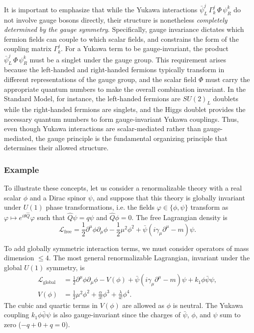 It is important to emphasize that while the Yukawa interactions $\bar{\psi}_L^j \, \Gamma^j_k \, \Phi \, \psi_R^k$ do not involve gauge bosons directly, their structure is nonetheless \textit{completely determined by the gauge symmetry}. Specifically, gauge invariance dictates which fermion fields can couple to which scalar fields, and constrains the form of the coupling matrix $\Gamma^j_k$. For a Yukawa term to be gauge-invariant, the product $\bar{\psi}_L^j \, \Phi \, \psi_R^k$ must be a singlet under the gauge group. This requirement arises because the left-handed and right-handed fermions typically transform in different representations of the gauge group, and the scalar field $\Phi$ must carry the appropriate quantum numbers to make the overall combination invariant. In the Standard Model, for instance, the left-handed fermions are $SU(2)_L$ doublets while the right-handed fermions are singlets, and the Higgs doublet provides the necessary quantum numbers to form gauge-invariant Yukawa couplings. Thus, even though Yukawa interactions are scalar-mediated rather than gauge-mediated, the gauge principle is the fundamental organizing principle that determines their allowed structure.

\subsubsection{Example}
To illustrate these concepts, let us consider a renormalizable theory with a real scalar $\phi$ and a Dirac spinor $\psi$, and suppose that this theory is globally invariant under $U(1)$ phase transformations, i.e. the fields $\varphi\in\{\phi,\psi\}$ transform as $\varphi\mapsto e^{i\theta \hat Q}\varphi $ such that $\hat Q \psi = q \psi$ and $\hat Q \phi=0$. The free Lagrangian density is
\begin{equation}
	\mathcal L_{\text{free}}=\frac{1}{2} \partial^{\mu} \phi \partial_{\mu} \phi-\frac{1}{2}\mu^2\phi^2+\bar{\psi}(i \gamma_\mu  \partial^\mu-m) \psi.
\end{equation}

To add globally symmetric interaction terms, we must consider operators of mass dimension $\leq 4$. The most general renormalizable Lagrangian, invariant under the global $U(1)$ symmetry, is
\begin{equation}
	\begin{aligned}
		\mathcal L_{\text{global}}&=\frac{1}{2} \partial^{\mu} \phi \partial_{\mu} \phi-V(\phi)+\bar{\psi}(i \gamma_\mu  \partial^\mu-m) \psi + k_1 \phi\bar\psi\psi,
		\\
		V(\phi)&=\frac{1}{2}\mu^2\phi^2 +\frac{\alpha}{3!}\phi^3+\frac{\lambda}{4!}\phi^4.
	\end{aligned}
\end{equation}
The cubic and quartic terms in $V(\phi)$ are allowed as $\phi$ is neutral. The Yukawa coupling $k_1 \phi\bar\psi\psi$ is also gauge-invariant since the charges of $\bar\psi$, $\phi$, and $\psi$ sum to zero ($-q + 0 + q = 0$).

